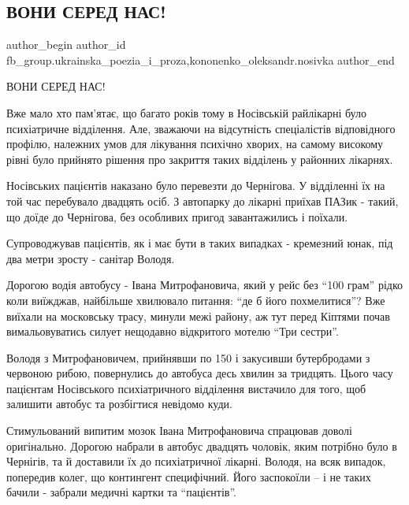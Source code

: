  
 
 
 
 

\subsection{ВОНИ СЕРЕД НАС!}
\label{sec:27_05_2023.fb.fb_group.ukrainska_poezia_i_proza.1.vony_sered_nas}
 
\ifcmt
 author_begin
   author_id fb_group.ukrainska_poezia_i_proza,kononenko_oleksandr.nosivka
 author_end
\fi

ВОНИ СЕРЕД НАС!

Вже мало хто пам'ятає, що багато років тому в Носівській райлікарні було
психіатричне відділення. Але, зважаючи на відсутність спеціалістів відповідного
профілю, належних умов для лікування психічно хворих, на самому високому рівні
було прийнято рішення про закриття таких відділень у районних лікарнях.

Носівських пацієнтів наказано було перевезти до Чернігова. У відділенні їх на
той час перебувало двадцять осіб. З автопарку до лікарні приїхав ПАЗик - такий,
що доїде до Чернігова, без особливих пригод завантажились і поїхали.

Супроводжував пацієнтів, як і має бути в таких випадках - кремезний юнак, під
два метри зросту - санітар Володя. 

Дорогою водія автобусу - Івана Митрофановича, який у рейс без \enquote{100 грам} рідко
коли виїжджав, найбільше хвилювало питання: \enquote{де б його похмелитися}? Вже
виїхали на московську трасу, минули межі району, аж тут перед Кіптями почав
вимальовуватись силует нещодавно відкритого мотелю \enquote{Три сестри}.

Володя з Митрофановичем, прийнявши по 150 і закусивши бутербродами з червоною
рибою, повернулись до автобуса десь хвилин за тридцять. Цього часу пацієнтам
Носівського психіатричного відділення вистачило для того, щоб залишити автобус
та розбігтися невідомо куди.

Стимульований випитим мозок Івана Митрофановича спрацював доволі оригінально.
Дорогою набрали в автобус двадцять чоловік, яким потрібно було в Чернігів, та й
доставили їх до психіатричної лікарні. Володя, на всяк випадок, попередив
колег, що контингент специфічний. Його заспокоїли – і не таких бачили - забрали
медичні картки та \enquote{пацієнтів}.

